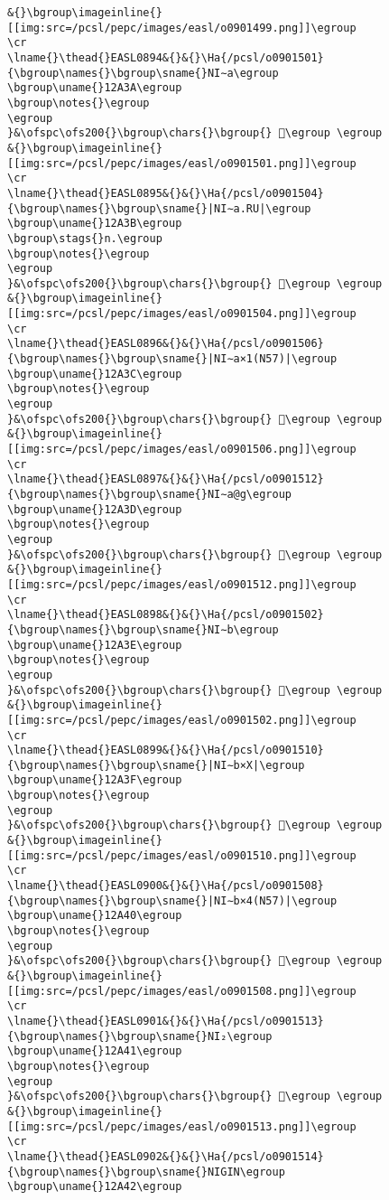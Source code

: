 \begin{verbatim}
&{}\bgroup\imageinline{}[[img:src=/pcsl/pepc/images/easl/o0901499.png]]\egroup
\cr
\lname{}\thead{}EASL0894&{}&{}\Ha{/pcsl/o0901501}{\bgroup\names{}\bgroup\sname{}NI∼a\egroup
\bgroup\uname{}12A3A\egroup
\bgroup\notes{}\egroup
\egroup
}&\ofspc\ofs200{}\bgroup\chars{}\bgroup{} 𒨺\egroup \egroup
&{}\bgroup\imageinline{}[[img:src=/pcsl/pepc/images/easl/o0901501.png]]\egroup
\cr
\lname{}\thead{}EASL0895&{}&{}\Ha{/pcsl/o0901504}{\bgroup\names{}\bgroup\sname{}|NI∼a.RU|\egroup
\bgroup\uname{}12A3B\egroup
\bgroup\stags{}n.\egroup
\bgroup\notes{}\egroup
\egroup
}&\ofspc\ofs200{}\bgroup\chars{}\bgroup{} 𒨻\egroup \egroup
&{}\bgroup\imageinline{}[[img:src=/pcsl/pepc/images/easl/o0901504.png]]\egroup
\cr
\lname{}\thead{}EASL0896&{}&{}\Ha{/pcsl/o0901506}{\bgroup\names{}\bgroup\sname{}|NI∼a×1(N57)|\egroup
\bgroup\uname{}12A3C\egroup
\bgroup\notes{}\egroup
\egroup
}&\ofspc\ofs200{}\bgroup\chars{}\bgroup{} 𒨼\egroup \egroup
&{}\bgroup\imageinline{}[[img:src=/pcsl/pepc/images/easl/o0901506.png]]\egroup
\cr
\lname{}\thead{}EASL0897&{}&{}\Ha{/pcsl/o0901512}{\bgroup\names{}\bgroup\sname{}NI∼a@g\egroup
\bgroup\uname{}12A3D\egroup
\bgroup\notes{}\egroup
\egroup
}&\ofspc\ofs200{}\bgroup\chars{}\bgroup{} 𒨽\egroup \egroup
&{}\bgroup\imageinline{}[[img:src=/pcsl/pepc/images/easl/o0901512.png]]\egroup
\cr
\lname{}\thead{}EASL0898&{}&{}\Ha{/pcsl/o0901502}{\bgroup\names{}\bgroup\sname{}NI∼b\egroup
\bgroup\uname{}12A3E\egroup
\bgroup\notes{}\egroup
\egroup
}&\ofspc\ofs200{}\bgroup\chars{}\bgroup{} 𒨾\egroup \egroup
&{}\bgroup\imageinline{}[[img:src=/pcsl/pepc/images/easl/o0901502.png]]\egroup
\cr
\lname{}\thead{}EASL0899&{}&{}\Ha{/pcsl/o0901510}{\bgroup\names{}\bgroup\sname{}|NI∼b×X|\egroup
\bgroup\uname{}12A3F\egroup
\bgroup\notes{}\egroup
\egroup
}&\ofspc\ofs200{}\bgroup\chars{}\bgroup{} 𒨿\egroup \egroup
&{}\bgroup\imageinline{}[[img:src=/pcsl/pepc/images/easl/o0901510.png]]\egroup
\cr
\lname{}\thead{}EASL0900&{}&{}\Ha{/pcsl/o0901508}{\bgroup\names{}\bgroup\sname{}|NI∼b×4(N57)|\egroup
\bgroup\uname{}12A40\egroup
\bgroup\notes{}\egroup
\egroup
}&\ofspc\ofs200{}\bgroup\chars{}\bgroup{} 𒩀\egroup \egroup
&{}\bgroup\imageinline{}[[img:src=/pcsl/pepc/images/easl/o0901508.png]]\egroup
\cr
\lname{}\thead{}EASL0901&{}&{}\Ha{/pcsl/o0901513}{\bgroup\names{}\bgroup\sname{}NI₂\egroup
\bgroup\uname{}12A41\egroup
\bgroup\notes{}\egroup
\egroup
}&\ofspc\ofs200{}\bgroup\chars{}\bgroup{} 𒩁\egroup \egroup
&{}\bgroup\imageinline{}[[img:src=/pcsl/pepc/images/easl/o0901513.png]]\egroup
\cr
\lname{}\thead{}EASL0902&{}&{}\Ha{/pcsl/o0901514}{\bgroup\names{}\bgroup\sname{}NIGIN\egroup
\bgroup\uname{}12A42\egroup

\end{verbatim}

